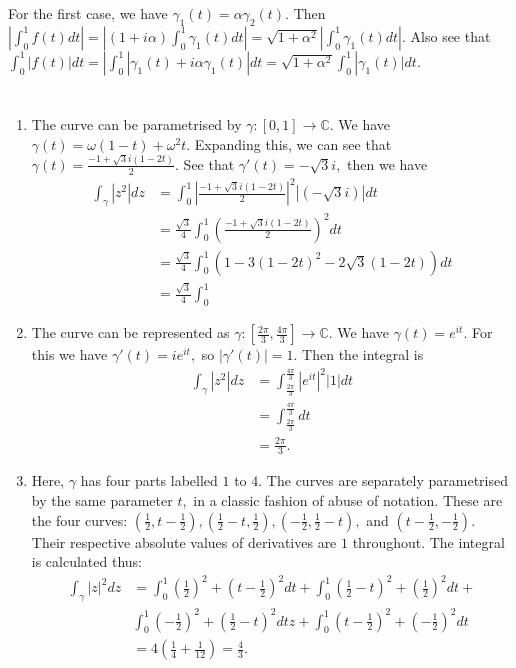 \documentclass{article}
\begin{document}
For the first case, we have $\gamma_1(t)=\alpha \gamma_2(t).$ Then $|\int_{0}^1 f(t)dt| = |(1+i\alpha)\int_{0}^1 \gamma_1(t)dt| = 
\sqrt{1+\alpha^2}|\int_{0}^1 \gamma_1(t)dt|.$ Also see that $\int_{0}^1 |f(t)|dt= |\int_{0}^1 |\gamma_1(t)+i\alpha \gamma_1(t)| dt = \sqrt{1+\alpha^2} 
\int_{0}^1 |\gamma_1(t)|dt.$ 


\section{} %
\begin{enumerate}
	\item The curve can be parametrised by $\gamma: [0,1] \to \mathbb{C}.$ We have $\gamma(t)=\omega( 1-t) +\omega^2 t.$ Expanding this, we can see that 
	$\gamma(t)= \frac{-1+ \sqrt{3}i(1-2t)}{2}.$ See that $\gamma'(t)=-\sqrt{3}i,$ then we have 
	\begin{align*}
		\int_{\gamma}|z^2|dz &= \int_{0}^{1}|\frac{-1+ \sqrt{3}i(1-2t)}{2}|^2 | (-\sqrt{3}i)|dt\\
		&= \frac{\sqrt{3}}{4}\int_{0}^1 (\frac{-1+ \sqrt{3}i(1-2t)}{2})^2dt\\
		&= \frac{\sqrt{3}}{4}\int_{0}^1 (1-3(1-2t)^2 -2\sqrt{3}(1-2t))dt\\
		&= \frac{\sqrt{3}}{4}\int_{0}^1 
	\end{align*}
	\item The curve can be represented as $\gamma:\left[\frac{2\pi}{3},\frac{4\pi}{3}\right] \to \mathbb{C}.$ We have $\gamma(t)= e^{it}.$ For this we have 
	$\gamma'(t)=ie^{it},$ so $|\gamma'(t)| =1.$ Then the integral is 
	\begin{align*}
		\int_{\gamma}|z^2|dz &= \int_{\frac{2\pi}{3}}^{\frac{4\pi}{3}}|e^{it}|^2|1|dt\\
		&= \int_{\frac{2\pi}{3}}^{\frac{4\pi}{3}}dt\\
		&= \frac{2\pi}{3}.
	\end{align*} 
	\item Here, $\gamma$ has four parts labelled $1$ to $4.$ The curves are separately parametrised by the same parameter $t,$ in a classic fashion of abuse 
	of notation. These are the four curves: $\left(\frac{1}{2},t-\frac{1}{2}\right), \left(\frac{1}{2}-t,\frac{1}{2}\right), 
	\left(-\frac{1}{2},\frac{1}{2}-t\right),$ and $\left(t-\frac{1}{2},-\frac{1}{2}\right).$ Their respective absolute values of derivatives are $1$ 
	throughout. The integral is calculated thus:
	\begin{align*}
		\int_{\gamma}|z|^2dz &= \int_{0}^1 \left(\frac{1}{2}\right)^2+\left(t-\frac{1}{2}\right)^2dt+ \int_{0}^1 
		\left(\frac{1}{2}-t\right)^2+\left(\frac{1}{2}\right)^2dt+\\
		&\int_{0}^1 \left(-\frac{1}{2}\right)^2+\left(\frac{1}{2}-t\right)^2dtz+ \int_{0}^1 \left(t-\frac{1}{2}\right)^2+\left(-\frac{1}{2}\right)^2dt\\
		&= 4(\frac{1}{4} + \frac{1}{12})=\frac{4}{3}. 
	\end{align*}
\end{enumerate}
\end{document}
